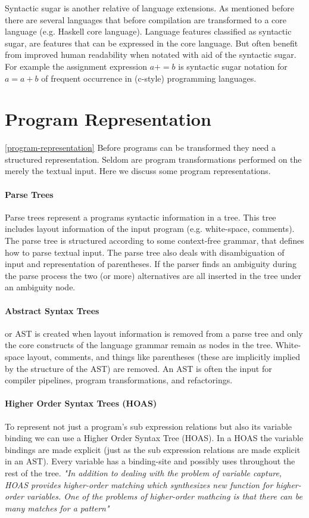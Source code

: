 Syntactic sugar is another relative of language extensions. As mentioned before there are several languages that before compilation are transformed to a core language (e.g. Haskell core language).  Language features classified as syntactic sugar, are features that can be expressed in the core language. But often benefit from improved human readability when notated with aid of the syntactic sugar. For example the assignment expression $a += b$ is syntactic sugar notation for $a = a + b$ of frequent occurrence in (c-style) programming languages.

\section{Program Representation} \ref{program-representation}
Before programs can be transformed they need a structured representation. Seldom are program transformations performed on the merely the textual input. Here we discuss some program representations.

\paragraph{Parse Trees} 
Parse trees represent a programs syntactic information in a tree. This tree includes layout information of the input program (e.g. white-space, comments). The parse tree is structured according to some context-free grammar, that defines how to parse textual input. The parse tree also deals with disambiguation of input and representation of parentheses. If the parser finds an ambiguity during the parse process the two (or more) alternatives are all inserted in the tree under an ambiguity node.

\paragraph{Abstract Syntax Trees}
or AST is created when layout information is removed from a parse tree and only the core constructs of the language grammar remain as nodes in the tree. White-space layout, comments, and things like parentheses (these are implicitly implied by the structure of the AST) are removed. An AST is often the input for compiler pipelines, program transformations, and refactorings.

\paragraph{Higher Order Syntax Trees (HOAS)}
To represent not just a program's sub expression relations but also its variable binding we can use a Higher Order Syntax Tree (HOAS)\cite{Pfenning}. In a HOAS the variable bindings are made explicit (just as the sub expression relations are made explicit in an AST). Every variable has a binding-site and possibly uses throughout the rest of the tree. \textit{"In addition to dealing with the problem of variable capture, HOAS provides higher-order matching which synthesizes new function for higher-order  variables. One of the problems of higher-order mathcing is that there can be many matches for a pattern"}\cite{Visser2001}

